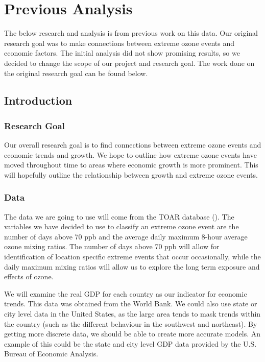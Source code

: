 \documentclass[11pt, oneside]{article}
\theoremstyle{definition}
\begin{document}
\newpage
 
\section{Previous Analysis}
The below research and analysis is from previous work on this data. Our original research goal was to make connections between extreme ozone events and economic factors. The initial analysis did not show promising results, so we decided to change the scope of our project and research goal. The work done on the original research goal can be found below.
\subsection{Introduction}
\subsubsection{Research Goal} %
Our overall research goal is to find connections between extreme ozone events and economic trends and growth. We hope to outline how extreme ozone events have moved throughout time to areas where economic growth is more prominent. This will hopefully outline the relationship between growth and extreme ozone events. 

\subsubsection{Data}
The data we are going to use will come from the TOAR database (\cite{schultz2017apmd}). The variables we have decided to use to classify an extreme ozone event are the number of days above 70 ppb and the average daily maximum 8-hour average ozone mixing ratios. The number of days above 70 ppb will allow for identification of location specific extreme events that occur occasionally, while the daily maximum mixing ratios will allow us to explore the long term exposure and effects of ozone. 

 We will examine the real GDP for each country as our indicator for economic trends. This data was obtained from the World Bank. We could also use state or city level data in the United States, as the large area tends to mask trends within the country (such as the different behaviour in the southwest and northeast). By getting more discrete data, we should be able to create more accurate models. An example of this could be the state and city level GDP data provided by the U.S. Bureau of Economic Analysis.
\end{document}
